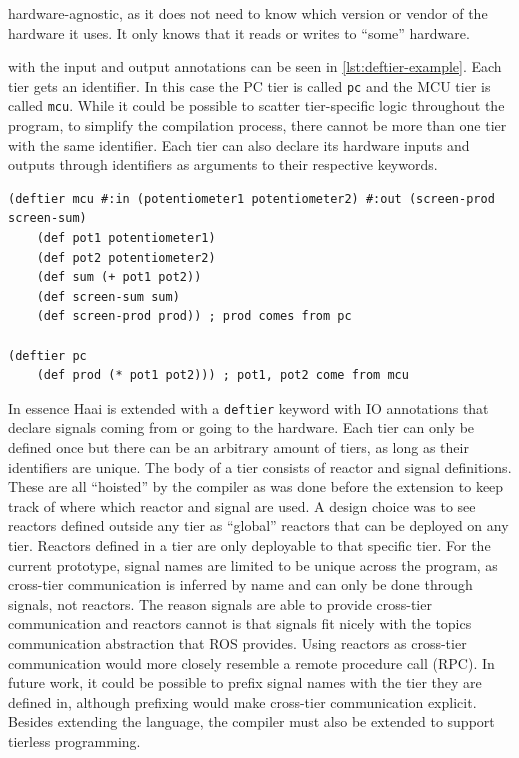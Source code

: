 \documentclass[a4paper]{book}
\begin{document}
hardware-agnostic, as it does not need to know which version or vendor of the
hardware it uses. It only knows that it reads or writes to \enquote{some}
hardware.
\par
{} with the input and output annotations can
be seen in \cref{lst:deftier-example}. Each tier gets an identifier. In this
case the PC tier is called \texttt{pc} and the MCU tier is called \texttt{mcu}.
While it could be possible to scatter tier-specific logic throughout the
program, to simplify the compilation process, there cannot be more than one tier
with the same identifier. Each tier can also declare its hardware inputs and
outputs through identifiers as arguments to their respective keywords.
\begin{listing}[ht]
	\begin{lstlisting}[language=Haai, morekeywords={deftier}, otherkeywords={\#:in,\#:out}]
(deftier mcu #:in (potentiometer1 potentiometer2) #:out (screen-prod screen-sum)
    (def pot1 potentiometer1)
    (def pot2 potentiometer2)
    (def sum (+ pot1 pot2))
    (def screen-sum sum)
    (def screen-prod prod)) ; prod comes from pc

(deftier pc
    (def prod (* pot1 pot2))) ; pot1, pot2 come from mcu\end{lstlisting}
	\caption{Product sum distributed over two tiers with IO annotations}
	\label{lst:deftier-example}
\end{listing}
\par
In essence Haai is extended with a \texttt{deftier} keyword with IO annotations
that declare signals coming from or going to the hardware. Each tier can only be defined once but there
can be an arbitrary amount of tiers, as long as their identifiers are unique.
The body of a tier consists of reactor and signal definitions. These are all
\enquote{hoisted} by the compiler as was done before the extension to keep track
of where which reactor and signal are used. A design choice was to see reactors
defined outside any tier as \enquote{global} reactors that can be deployed on
any tier. Reactors defined in a tier are only deployable to that specific tier.
For the current prototype, signal names are limited to be unique across the
program, as cross-tier communication is inferred by name and can only be done
through signals, not reactors. The reason signals are able to provide
cross-tier communication and reactors cannot is that signals fit nicely with
the topics communication abstraction that ROS provides. Using reactors as
cross-tier communication would more closely resemble a remote procedure call
(RPC). In future work, it could be possible to prefix signal names with the tier
they are defined in, although
prefixing would make cross-tier communication explicit. Besides extending the
language, the compiler must also be extended to support tierless programming.
\end{document}
